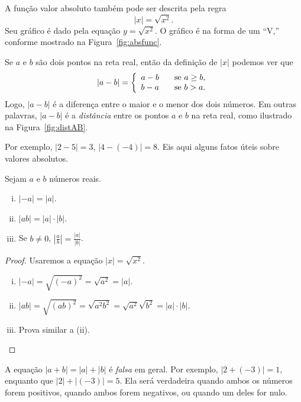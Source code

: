 \documentclass{svmono}
\begin{document}
A função valor absoluto também pode ser descrita pela regra
\[
  |x| = \sqrt{x^2}.
\]
Seu gráfico é dado pela equação $y = \sqrt{x^2}$. O gráfico é
na forma de um ``V,'' conforme mostrado na Figura~\ref{fig:absfunc}.


Se $a$ e $b$ são dois pontos na reta real, então da definição
de $|x|$ podemos ver que
\[
  |a - b| = \left\{
            \begin{array}{r l}
              a - b & \hspace{2ex} \text{se } a \ge b, \\
              b - a & \hspace{2ex} \text{se } b > a.
            \end{array}
            \right.
\]
Logo, $|a-b|$ é a diferença entre o maior e o menor
dos dois números. Em outras palavras, $|a-b|$ é a
\emph{distância} entre os pontos $a$ e $b$ na reta real,
como ilustrado na Figura~\ref{fig:distAB}.


Por exemplo, $|2-5| = 3$, $|4 - (-4)| = 8$. Eis aqui alguns
fatos úteis sobre valores absolutos.

\begin{theorem}
\label{theo:absvalues}
Sejam $a$ e $b$ números reais.
\begin{enumerate}[(i)]
  \item $|-a| = |a|$.
  \item $|ab| = |a|\cdot|b|$.
  \item Se $b \ne 0$, $\displaystyle\left|\frac{a}{b}\right| = \frac{|a|}{|b|}$.
\end{enumerate}
\end{theorem}

\begin{proof}
Usaremos a equação $|x| = \sqrt{x^2}$.
\begin{enumerate}[(i)]
  \item $|-a| = \sqrt{(-a)^2} = \sqrt{a^2} = |a|.$
  \item $|ab| = \sqrt{(ab)^2} = \sqrt{a^2b^ 2} = \sqrt{a^2}\sqrt{b^2}
         = |a|\cdot|b|.$
  \item Prova similar a (ii).
\end{enumerate}
\end{proof}

\begin{warning}
A equação $|a + b| = |a|+|b|$ é \emph{falsa} em geral. Por exemplo,
$|2 + (-3)| = 1$, enquanto que $|2| + |(-3)| = 5$. Ela será verdadeira
quando ambos os números forem positivos, quando ambos forem negativos,
ou quando um deles for nulo.
\end{warning}
\end{document}
